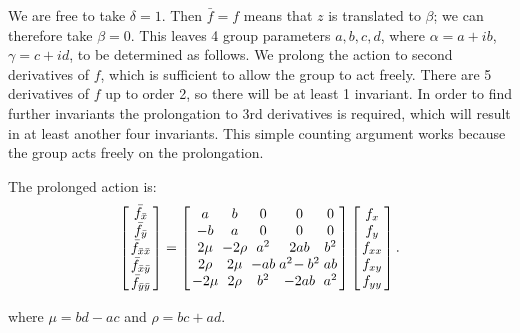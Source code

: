 \documentclass{artjlt}
\begin{document}
We are free to take $\delta=1$. Then $\bar f = f$ means that $z$ is translated to $\beta$; we can therefore take $\beta=0$. This leaves 4 group parameters $a,b,c,d$, where $\alpha = a + i b$, $\gamma = c + i d$, to be determined as follows. We prolong the action to second derivatives of $f$, which is sufficient to allow the group to act freely. There are 5 derivatives of $f$ up to order 2, so there will be at least 1 invariant. In order to find further invariants the prolongation to 3rd derivatives is required, which will result in at least another four invariants. This simple counting argument works because the group acts freely on the prolongation. %

The prolonged action is:
\begin{equation}
\arraycolsep=1.4pt
\left[
\begin{array}{c}
  \bar f_{\bar x} \\ \bar f_{\bar y} \\ \bar f_{\bar x \bar x} \\ \bar f_{\bar x \bar y} \\ \bar f_{\bar y \bar y} 
 \end{array}
 \right]
 = 
\left[
\begin{array}{ccccc}
 a & b & 0 & 0 & 0 \\
 -b & a & 0 & 0 & 0 \\
 2\mu & -2 \rho & a^2 & 2 a b & b^2 \\
 2 \rho & 2\mu & -a b & a^2\!-b^2 & a b \\
 -2\mu & 2 \rho & b^2 & -2 a b & a^2 \\
\end{array}
\right]\left[
\begin{array}{c}
f_x \\ f_y \\ f_{xx} \\ f_{xy} \\ f_{yy} \\
 \end{array}
 \right].
\label{eqn:mobius}
 \end{equation}

\noindent where $\mu = b d - a c$ and $\rho = b c + a d$.
\end{document}
